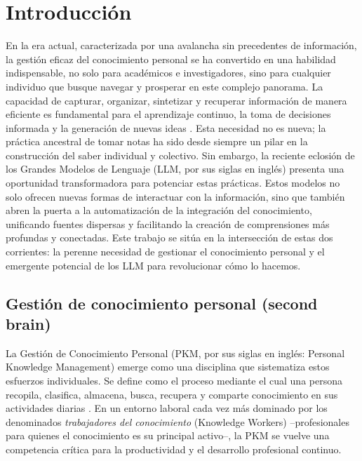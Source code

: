 \chapter{Introducción}
\label{chapter:introduccion}

En la era actual, caracterizada por una avalancha sin precedentes de información, la gestión eficaz del conocimiento personal se ha convertido en una habilidad indispensable, no solo para académicos e investigadores, sino para cualquier individuo que busque navegar y prosperar en este complejo panorama. La capacidad de capturar, organizar, sintetizar y recuperar información de manera eficiente es fundamental para el aprendizaje continuo, la toma de decisiones informada y la generación de nuevas ideas \citep{forteBuildingSecondBrain2022, ahrensHowTakeSmart2017}. Esta necesidad no es nueva; la práctica ancestral de tomar notas ha sido desde siempre un pilar en la construcción del saber individual y colectivo. Sin embargo, la reciente eclosión de los Grandes Modelos de Lenguaje (LLM, por sus siglas en inglés) presenta una oportunidad transformadora para potenciar estas prácticas. Estos modelos no solo ofrecen nuevas formas de interactuar con la información, sino que también abren la puerta a la automatización de la integración del conocimiento, unificando fuentes dispersas y facilitando la creación de comprensiones más profundas y conectadas. Este trabajo se sitúa en la intersección de estas dos corrientes: la perenne necesidad de gestionar el conocimiento personal y el emergente potencial de los LLM para revolucionar cómo lo hacemos.

\section{Gestión de conocimiento personal (second brain)}
\label{sec:gestion_conocimiento_personal}

La Gestión de Conocimiento Personal (PKM, por sus siglas en inglés: Personal Knowledge Management) emerge como una disciplina que sistematiza estos esfuerzos individuales. Se define como el proceso mediante el cual una persona recopila, clasifica, almacena, busca, recupera y comparte conocimiento en sus actividades diarias \citep{grundspenkisAgentBasedApproach2007}. En un entorno laboral cada vez más dominado por los denominados \textit{trabajadores del conocimiento} (Knowledge Workers) –profesionales para quienes el conocimiento es su principal activo–, la PKM se vuelve una competencia crítica para la productividad y el desarrollo profesional continuo.

